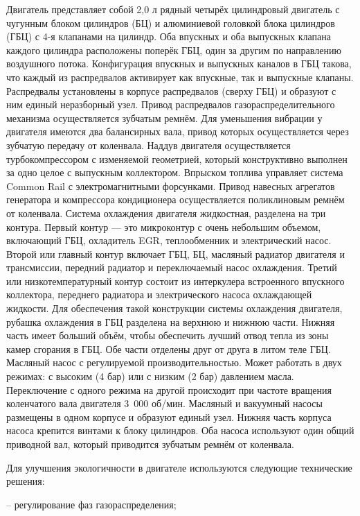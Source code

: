 { Двигатель  представляет собой 2,0 л  рядный четырёх цилиндровый двигатель с чугунным блоком цилиндров (БЦ) и алюминиевой головкой блока цилиндров (ГБЦ) с 4-я клапанами на цилиндр. Оба впускных и оба выпускных клапана каждого цилиндра расположены поперёк ГБЦ, один за другим по направлению воздушного  потока. Конфигурация впускных и выпускных каналов в ГБЦ такова, что каждый из распредвалов активирует как впускные, так и выпускные клапаны. Распредвалы установлены в корпусе распредвалов (сверху ГБЦ) и образуют с ним единый неразборный узел. Привод распредвалов газораспределительного механизма  осуществляется зубчатым ремнём. Для уменьшения вибрации у двигателя имеются два балансирных вала, привод которых осуществляется через зубчатую передачу от коленвала. Наддув двигателя осуществляется турбокомпрессором  с изменяемой геометрией, который конструктивно выполнен за одно целое с выпускным коллектором. Впрыском топлива управляет система Common Rail с электромагнитными форсунками. Привод навесных агрегатов генератора и компрессора кондиционера осуществляется поликлиновым ремнём от коленвала. Система охлаждения двигателя жидкостная,  разделена на три контура. Первый контур — это микроконтур с очень небольшим объемом, включающий ГБЦ, охладитель EGR, теплообменник и электрический насос.  Второй или главный контур включает ГБЦ, БЦ, масляный радиатор двигателя и трансмиссии, передний радиатор и переключаемый насос охлаждения. Третий или низкотемпературный контур состоит из интеркулера встроенного впускного коллектора, переднего радиатора и электрического насоса охлаждающей жидкости. Для обеспечения такой конструкции системы охлаждения двигателя, рубашка охлаждения в ГБЦ разделена на верхнюю и нижнюю части. Нижняя часть имеет больший объём, чтобы обеспечить лучший отвод тепла из зоны камер сгорания в ГБЦ. Обе части отделены друг от друга в литом теле ГБЦ. Масляный насос с регулируемой производительностью. Может работать в двух режимах: с высоким (4 бар) или с низким (2 бар) давлением масла. Переключение с одного режима на другой происходит при частоте вращения коленчатого вала двигателя 3 000 об/мин. Масляный и вакуумный насосы размещены в одном корпусе и образуют единый узел. Нижняя часть корпуса насоса крепится винтами к блоку цилиндров. Оба насоса используют один общий приводной вал, который приводится зубчатым ремнём от коленвала.
 
 Для улучшения экологичности в двигателе используются следующие технические решения:
 
 -- регулирование фаз газораспределения;
 
}
